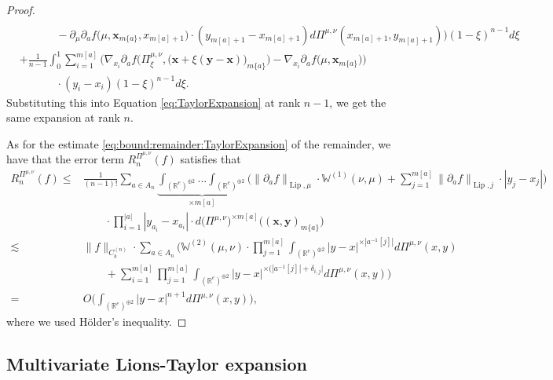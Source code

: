 \documentclass[a4paper,11pt,twoside]{article}
\numberwithin{equation}{section}
\theoremstyle{plain}
\newcommand{\bR}{\mathbb{R}}
\newcommand{\bW}{\mathbb{W}}
\DeclareMathOperator{\lip}{Lip}
\newcommand{\1}{\mathbbm{1}}
\begin{document}
\begin{proof}
\begin{align*}
			\\
			&\hspace{40pt} - \partial_\mu \partial_a f\Big(\mu, \boldsymbol{x}_{m\{a\}}, x_{m[a]+1} \Big)  \cdot ( y_{m[a]+1} - x_{m[a]+1}) d\Pi^{\mu, \nu}(x_{m[a]+1}, y_{m[a]+1})\bigg) (1-\xi)^{n-1} d\xi
			\\
			&+\tfrac{1}{n-1} \int_0^1 \sum_{i=1}^{m[a]} \bigg( \nabla_{x_i} \partial_a f\Big( \Pi_\xi^{\mu, \nu}, \big(\boldsymbol{x} + \xi(\boldsymbol{y} - \boldsymbol{x}) \big)_{m\{a\}} \Big) - \nabla_{x_i}\partial_a f\Big( \mu, \boldsymbol{x}_{m\{a\}}\Big) \bigg) 
			\\
			&\hspace{40pt} \cdot (y_i - x_i) (1-\xi)^{n-1} d\xi. 
		\end{align*}
		Substituting this into Equation \eqref{eq:TaylorExpansion} at rank $n-1$, we get the same expansion at rank $n$.
		
		As for the estimate \eqref{eq:bound:remainder:TaylorExpansion} of the remainder, we have that the error term $R_n^{\Pi^{\mu, \nu}}(f)$ satisfies that
		\begin{align*}
			R_n^{\Pi^{\mu, \nu}}(f)
			\leq&
			\tfrac{1}{(n-1)!} \sum_{a\in A_n} \underbrace{\int_{(\bR^e)^{\oplus 2}} ... \int_{(\bR^e)^{\oplus 2}} }_{\times m[a]} \bigg( \big\| \partial_a f \big\|_{\lip, \mu} \cdot \bW^{(1)}(\nu, \mu) + \sum_{j=1}^{m[a]} \big\| \partial_a f \big\|_{\lip, j} \cdot |y_j - x_j| \bigg) 
			\\
			&\qquad \cdot \prod_{i=1}^{|a|} |y_{a_i} - x_{a_i} | \cdot d\big( \Pi^{\mu, \nu}\big)^{\times m[a]} \Big( (\boldsymbol{x}, \boldsymbol{y})_{m\{a\}}\Big)
			\\
			\lesssim& \| f\|_{C_b^{(n)}} \cdot \sum_{a\in A_n} \bigg( \bW^{(2)} (\mu, \nu) \cdot \prod_{j=1}^{m[a]} \int_{(\bR^e)^{\oplus 2}} |y-x|^{\times |a^{-1}[j]|} d\Pi^{\mu, \nu}(x, y) 
			\\
			&\qquad + \sum_{i=1}^{m[a]}  \prod_{j=1}^{m[a]} \int_{(\bR^e)^{\oplus 2}} |y-x|^{\times (|a^{-1}[j]| + \delta_{i,j}|} d\Pi^{\mu, \nu}(x, y) \bigg)
			\\
			=& O\Bigg( \int_{(\bR^e)^{\oplus 2}} |y-x|^{n+1} d\Pi^{\mu, \nu}(x, y) \Bigg), 
		\end{align*}
		where we used H\"older's inequality.
	\end{proof}
	
	\subsection{Multivariate Lions-Taylor expansion}
	\label{subsect:Multivariate_Lions-Taylor}
	
\end{document}
